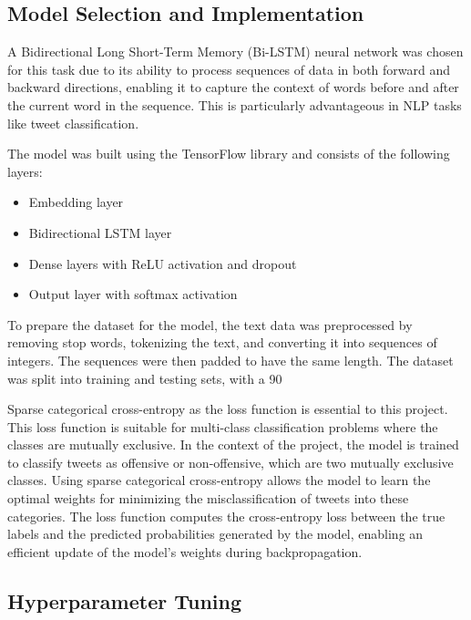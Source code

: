 \documentclass[11pt]{article}
\begin{document}
\subsection{Model Selection and Implementation}

A Bidirectional Long Short-Term Memory (Bi-LSTM) neural network was chosen for this task due to its ability to process sequences of data in both forward and backward directions, enabling it to capture the context of words before and after the current word in the sequence. This is particularly advantageous in NLP tasks like tweet classification.

The model was built using the TensorFlow library and consists of the following layers:
\begin{itemize}
\item Embedding layer
\item Bidirectional LSTM layer
\item Dense layers with ReLU activation and dropout
\item Output layer with softmax activation
\end{itemize}

To prepare the dataset for the model, the text data was preprocessed by removing stop words, tokenizing the text, and converting it into sequences of integers. The sequences were then padded to have the same length. The dataset was split into training and testing sets, with a 90%

\setlength{\parskip}{1em} %
Sparse categorical cross-entropy as the loss function is essential to this project. This loss function is suitable for multi-class classification problems where the classes are mutually exclusive. In the context of the project, the model is trained to classify tweets as offensive or non-offensive, which are two mutually exclusive classes. Using sparse categorical cross-entropy allows the model to learn the optimal weights for minimizing the misclassification of tweets into these categories. The loss function computes the cross-entropy loss between the true labels and the predicted probabilities generated by the model, enabling an efficient update of the model's weights during backpropagation.




\subsection{Hyperparameter Tuning}
\end{document}
